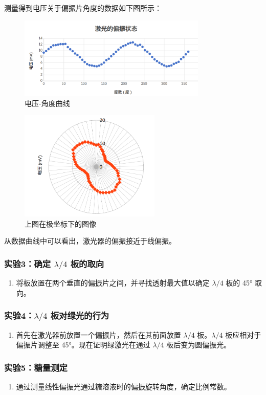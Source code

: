 \documentclass{ctexart}
\begin{document}
测量得到电压关于偏振片角度的数据如下图所示：
\begin{figure}[H]
    \centering
    \includegraphics[width=0.8\textwidth]{实验二.png}
    \caption{电压-角度曲线}
\end{figure}
\begin{figure}[H]
    \centering
    \includegraphics[width=0.6\textwidth]{实验二-2.png}
    \caption{上图在极坐标下的图像}
\end{figure}

从数据曲线中可以看出，激光器的偏振接近于线偏振。

\subsubsection{实验3：确定 $\lambda/4$ 板的取向}
\begin{enumerate}
    \item 将板放置在两个垂直的偏振片之间，并寻找透射最大值以确定 $\lambda/4$ 板的 45° 取向。
\end{enumerate}

\subsubsection{实验4：$\lambda/4$ 板对绿光的行为}
\begin{enumerate}
    \item 首先在激光器前放置一个偏振片，然后在其前面放置 $\lambda/4$ 板。$\lambda/4$ 板应相对于偏振片调整至 45°。现在证明绿激光在通过 $\lambda/4$ 板后变为圆偏振光。
\end{enumerate}

\subsubsection{实验5：糖量测定}
\begin{enumerate}
    \item 通过测量线性偏振光通过糖溶液时的偏振旋转角度，确定比例常数。
\end{enumerate}
\end{document}
